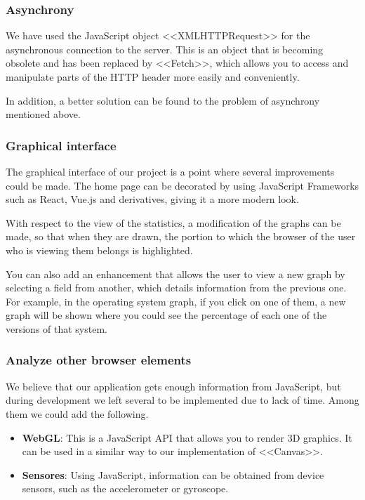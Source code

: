 \subsubsection{Asynchrony}

We have used the JavaScript object <<XMLHTTPRequest>> for the asynchronous connection to the server. This is an object that is becoming obsolete and has been replaced by <<Fetch>>, which allows you to access and manipulate parts of the HTTP header more easily and conveniently. \par
In addition, a better solution can be found to the problem of asynchrony mentioned above.

\subsubsection{Graphical interface}

The graphical interface of our project is a point where several improvements could be made. The home page can be decorated by using JavaScript Frameworks such as React, Vue.js and derivatives, giving it a more modern look. \par

With respect to the view of the statistics, a modification of the graphs can be made, so that when they are drawn, the portion to which the browser of the user who is viewing them belongs is highlighted. \par 

You can also add an enhancement that allows the user to view a new graph by selecting a field from another, which details information from the previous one. For example, in the operating system graph, if you click on one of them, a new graph will be shown where you could see the percentage of each one of the versions of that system.
\subsubsection{Analyze other browser elements}
We believe that our application gets enough information from JavaScript, but during development we left several to be implemented due to lack of time. Among them we could add the following.
\begin{itemize}
    \item \textbf{WebGL}: This is a JavaScript API that allows you to render 3D graphics. It can be used in a similar way to our implementation of <<Canvas>>.
    \item \textbf{Sensores}: Using JavaScript, information can be obtained from device sensors, such as the accelerometer or gyroscope.
\end{itemize}
